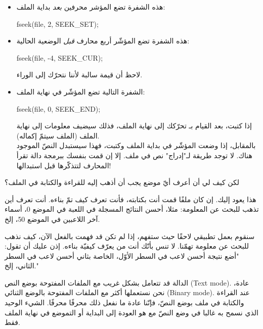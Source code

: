 \begin{itemize}
  \item هذه الشفرة تضع المؤشر محرفين
\textit{بعد}
بداية الملف:

  \begin{Csource}
fseek(file, 2, SEEK_SET);
  \end{Csource}

  \item هذه الشفرة تضع المؤشّر أربع محارف
\textit{قبل}
الوضعية الحالية:

  \begin{Csource}
fseek(file, -4, SEEK_CUR);
  \end{Csource}

  لاحظ أن قيمة
سالبة لأننا نتحرّك إلى الوراء.
  \item الشفرة التالية تضع المؤشّر في نهاية الملف:
 
  \begin{Csource}
fseek(file, 0, SEEK_END);
  \end{Csource}

  إذا كتبت، بعد القيام بـ
تحرّكك إلى نهاية الملف، فذلك سيضيف معلومات إلى نهاية الملف (الملف سيتمّ إكماله).\\
بالمقابل، إذا وضعت المؤشّر في بداية الملف وكتبت، فهذا سيستبدل النصّ الموجود هناك. لا توجد طريقة لـ"إدراج" نص في ملف. إلا إن قمت بنفسك ببرمجة دالة تقرأ المحارف لتتذكّرها قبل استبدالها!
\end{itemize}

\begin{question}
لكن كيف لي أن أعرف أيّ موضع يجب أن أذهب إليه للقراءة والكتابة في الملف؟
\end{question}

هذا يعود إليك. إن كان ملفًا قمت أنت بكتابته، فأنت تعرف كيف تمّ بناءه. أنت تعرف أين تذهب للبحث عن المعلومة: مثلا، أحسن النتائج المسجلة في اللعبة في الموضع 0، أسماء آخر اللاعبين في الموضع 50، إلخ.

سنقوم بعمل تطبيقي لاحقًا حيث ستفهم، إذا لم تكن قد فهمت بالفعل الآن، كيف نذهب للبحث عن معلومة تهمّنا. لا تنس بأنّك أنت من يعرّف كيفيّة بناءه. إذن عليك أن تقول: "أضع نتيجة أحسن لاعب في السطر الأوّل، الخاصة بثاني أحسن لاعب في السطر الثاني، إلخ."

\begin{warning}
الدالة
قد تتعامل بشكل غريب مع الملفات المفتوحة بوضع النص
(\textenglish{Text mode}).
عادة، نحن نستعملها أكثر مع الملفات المفتوحة بالوضع الثنائي
(\textenglish{Binary mode}).
عند القراءة والكتابة في ملف بوضع النصّ، فإنّنا عادة ما نفعل ذلك محرفًا محرفًا. الشيء الوحيد الذي نسمح به غالبا في وضع النصّ مع
هو العودة إلى البداية أو التموضع في نهاية الملف فقط.
\end{warning}

